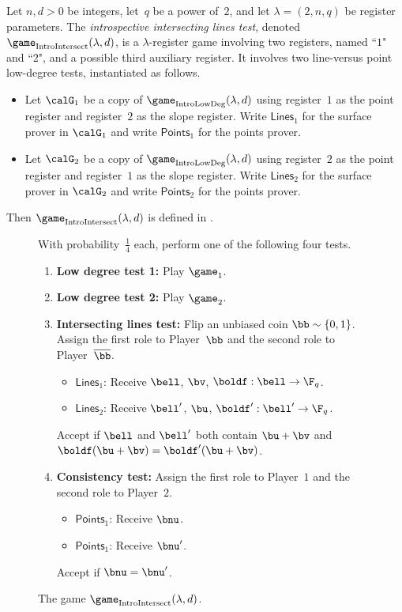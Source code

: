 \begin{definition}
Let $n, d> 0$ be integers, let~$q$ be a power of~$2$, and let $\lambda = (2, n, q)$ be register parameters.
The \emph{introspective intersecting lines test}, denoted $\game_{\mathrm{IntroIntersect}}(\lambda, d)$,
is a $\lambda$-register game involving two registers, named ``$1$" and ``$2$", and a possible third auxiliary register.
It involves two line-versus point low-degree tests, instantiated as follows.
\begin{itemize}
\item[$\circ$] Let $\calG_1$ be a copy of $\game_{\mathrm{IntroLowDeg}}(\lambda, d)$
		using register~$1$ as the point register and register~$2$ as the slope register.
	Write $\mathsf{Lines}_1$ for the surface prover in $\calG_1$ and write $\mathsf{Points}_1$ for the points prover.
\item[$\circ$] Let $\calG_2$ be a copy of $\game_{\mathrm{IntroLowDeg}}(\lambda, d)$
		using register~$2$ as the point register and register~$1$ as the slope register.
	Write $\mathsf{Lines}_2$ for the surface prover in $\calG_2$ and write $\mathsf{Points}_2$ for the points prover.
\end{itemize}
Then $\game_{\mathrm{IntroIntersect}}(\lambda, d)$ is defined in .
\end{definition}

{
\begin{figure}
With probability~$\tfrac{1}{4}$ each, perform one of the following four tests.
\begin{enumerate}
	\item \textbf{Low degree test 1:} Play $\game_1$.
	\item \textbf{Low degree test 2:} Play $\game_2$.
	\item \textbf{Intersecting lines test:} Flip an unbiased coin $\bb \sim \{0, 1\}$.
		Assign the first role to Player~$\bb$ and the second role to Player~$\overline{\bb}$.
		\begin{itemize}
		\item[$\circ$] $\mathsf{Lines}_1$: Receive $\bell$, $\bv$, $\boldf:\bell\rightarrow \F_q$.
		\item[$\circ$] $\mathsf{Lines}_2$: Receive $\bell'$, $\bu$, $\boldf':\bell'\rightarrow \F_q$.
		\end{itemize}
		Accept if $\bell$ and $\bell'$ both contain $\bu + \bv$ and $\boldf(\bu + \bv) = \boldf'(\bu + \bv)$.
	\item \textbf{Consistency test:} Assign the first role to Player~$1$ and the second role to Player~$2$.
		\begin{itemize}
		\item[$\circ$] $\mathsf{Points}_1$: Receive $\bnu$.
		\item[$\circ$] $\mathsf{Points}_1$: Receive $\bnu'$.
		\end{itemize}
		Accept if $\bnu = \bnu'$.
	\end{enumerate}
	\caption{The game $\game_{\mathrm{IntroIntersect}}(\lambda, d)$.\label{fig:big-transfer}}
\end{figure}
}

